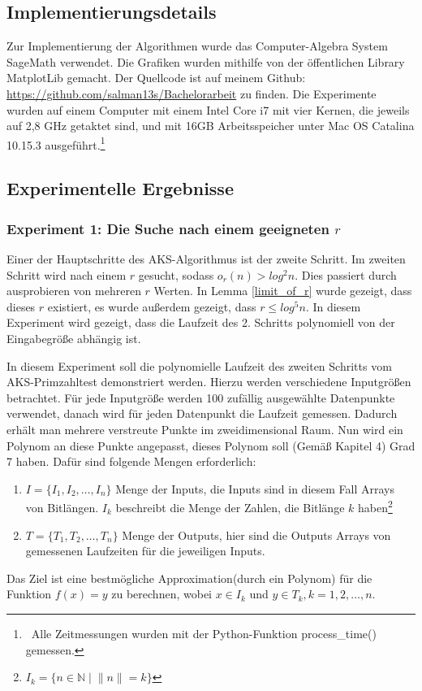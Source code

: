 \documentclass[12pt,oneside]{article}
\theoremstyle{remark}
\theoremstyle{definition}
\begin{document}
\subsection{Implementierungsdetails}
Zur Implementierung der Algorithmen wurde das Computer-Algebra System SageMath verwendet. Die Grafiken wurden mithilfe von der öffentlichen Library MatplotLib gemacht. Der Quellcode ist auf meinem Github: \url{https://github.com/salman13s/Bachelorarbeit} zu finden. Die Experimente wurden auf einem Computer mit einem Intel Core i7 mit vier Kernen, die jeweils auf 2,8 GHz getaktet sind, und mit 16GB Arbeitsspeicher unter Mac OS Catalina 10.15.3 ausgeführt.\footnote{$\,$ Alle Zeitmessungen wurden mit der Python-Funktion process\_time() gemessen.}

\subsection{Experimentelle Ergebnisse}

\subsubsection{Experiment 1: Die Suche nach einem geeigneten $r$}
Einer der Hauptschritte des AKS-Algorithmus ist der zweite Schritt. Im zweiten Schritt wird nach einem $r$ gesucht, sodass $o_r(n) > log^2 n$. Dies passiert durch ausprobieren von mehreren $r$ Werten. In Lemma \ref{limit_of_r} wurde gezeigt, dass dieses $r$ existiert, es wurde außerdem gezeigt, dass $r \leq log^5 n$. In diesem Experiment wird gezeigt, dass die Laufzeit des 2. Schritts polynomiell von der Eingabegröße abhängig ist.

\textbf{}\newline
In diesem Experiment soll die polynomielle Laufzeit des zweiten Schritts vom AKS-Primzahltest demonstriert werden. Hierzu werden verschiedene Inputgrößen betrachtet. Für jede Inputgröße werden 100 zufällig ausgewählte Datenpunkte verwendet, danach wird für jeden Datenpunkt die Laufzeit gemessen. Dadurch erhält man mehrere verstreute Punkte im zweidimensional Raum. Nun wird ein Polynom an diese Punkte angepasst, dieses Polynom soll (Gemäß Kapitel 4) Grad 7 haben. Dafür sind folgende Mengen erforderlich:

\begin{enumerate}
    \item $I = \{ I_{1},I_{2}, \dots, I_{n} \}$ Menge der Inputs, die Inputs sind in diesem Fall Arrays von  Bitlängen. $I_{k}$ beschreibt die Menge der Zahlen, die Bitlänge $k$ haben\footnote{$I_{k} = \{ n \in \mathbb{N} \mid \lVert n\rVert = k\}$}\newline
    
    \item $ T = \{T_{1},T_{2}, \dots, T_{n}\}$ Menge der Outputs, hier sind die Outputs Arrays von gemessenen Laufzeiten für die jeweiligen Inputs. 
\end{enumerate}
Das Ziel ist eine bestmögliche Approximation(durch ein Polynom) für die Funktion $f(x) = y$ zu berechnen, wobei $x \in I_{k}$ und $y \in T_{k}, k = 1,2, \dots, n$.
\end{document}
